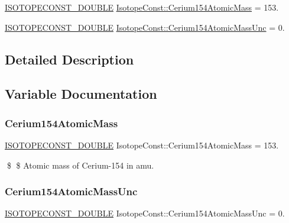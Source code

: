 \begin{DoxyCompactItemize}
\item 
\mbox{\hyperlink{group___isotope_const-_macros_ga8f45a7272ce02c0b4c65c44636ed719a}{I\+S\+O\+T\+O\+P\+E\+C\+O\+N\+S\+T\+\_\+\+D\+O\+U\+B\+LE}} \mbox{\hyperlink{group___isotope_const-_cerium-_ce154_ga1676fa619c2133036ef6cebbf5c219eb}{Isotope\+Const\+::\+Cerium154\+Atomic\+Mass}} = 153.
\item 
\mbox{\hyperlink{group___isotope_const-_macros_ga8f45a7272ce02c0b4c65c44636ed719a}{I\+S\+O\+T\+O\+P\+E\+C\+O\+N\+S\+T\+\_\+\+D\+O\+U\+B\+LE}} \mbox{\hyperlink{group___isotope_const-_cerium-_ce154_ga61be6174193a9153df411115e2f0fac6}{Isotope\+Const\+::\+Cerium154\+Atomic\+Mass\+Unc}} = 0.
\end{DoxyCompactItemize}


\subsection{Detailed Description}


\subsection{Variable Documentation}
\mbox{\label{group___isotope_const-_cerium-_ce154_ga1676fa619c2133036ef6cebbf5c219eb}} 
\subsubsection{\texorpdfstring{Cerium154\+Atomic\+Mass}{Cerium154AtomicMass}}
{\footnotesize\ttfamily \mbox{\hyperlink{group___isotope_const-_macros_ga8f45a7272ce02c0b4c65c44636ed719a}{I\+S\+O\+T\+O\+P\+E\+C\+O\+N\+S\+T\+\_\+\+D\+O\+U\+B\+LE}} Isotope\+Const\+::\+Cerium154\+Atomic\+Mass = 153.}

\$ \$ Atomic mass of Cerium-\/154 in amu. \mbox{\label{group___isotope_const-_cerium-_ce154_ga61be6174193a9153df411115e2f0fac6}} 
\subsubsection{\texorpdfstring{Cerium154\+Atomic\+Mass\+Unc}{Cerium154AtomicMassUnc}}
{\footnotesize\ttfamily \mbox{\hyperlink{group___isotope_const-_macros_ga8f45a7272ce02c0b4c65c44636ed719a}{I\+S\+O\+T\+O\+P\+E\+C\+O\+N\+S\+T\+\_\+\+D\+O\+U\+B\+LE}} Isotope\+Const\+::\+Cerium154\+Atomic\+Mass\+Unc = 0.}

